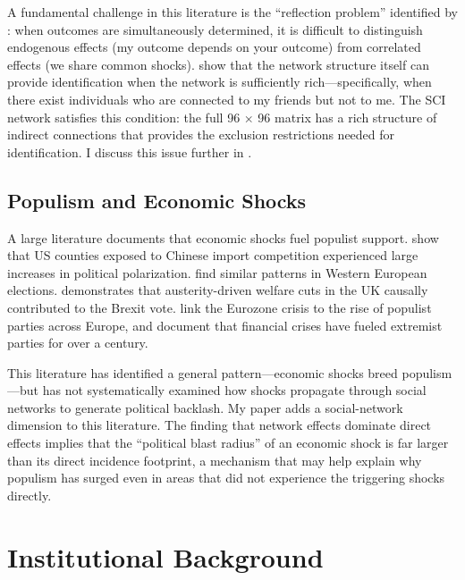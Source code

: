 \documentclass[12pt]{article}
\begin{document}
A fundamental challenge in this literature is the ``reflection problem'' identified by \citet{manski1993identification}: when outcomes are simultaneously determined, it is difficult to distinguish endogenous effects (my outcome depends on your outcome) from correlated effects (we share common shocks). \citet{bramouelle2009identification} show that the network structure itself can provide identification when the network is sufficiently rich---specifically, when there exist individuals who are connected to my friends but not to me. The SCI network satisfies this condition: the full 96 $\times$ 96 matrix has a rich structure of indirect connections that provides the exclusion restrictions needed for identification. I discuss this issue further in .

\subsection{Populism and Economic Shocks}

A large literature documents that economic shocks fuel populist support. \citet{autor2013china} show that US counties exposed to Chinese import competition experienced large increases in political polarization. \citet{colantone2018trade} find similar patterns in Western European elections. \citet{fetzer2019did} demonstrates that austerity-driven welfare cuts in the UK causally contributed to the Brexit vote. \citet{guiso2019global} link the Eurozone crisis to the rise of populist parties across Europe, and \citet{funke2016going} document that financial crises have fueled extremist parties for over a century.

This literature has identified a general pattern---economic shocks breed populism---but has not systematically examined how shocks propagate through social networks to generate political backlash. My paper adds a social-network dimension to this literature. The finding that network effects dominate direct effects implies that the ``political blast radius'' of an economic shock is far larger than its direct incidence footprint, a mechanism that may help explain why populism has surged even in areas that did not experience the triggering shocks directly.



\section{Institutional Background}
\label{sec:background}
\end{document}
